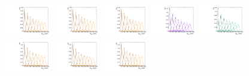 \begin{figure}[htbp]
  \centering
  \includegraphics[width=0.18\textwidth]{fig/2Dfit/templateSignalVsMX_fromDC_GbuToWW_MVV_mu_HP_bb_LDy.pdf}
  \includegraphics[width=0.18\textwidth]{fig/2Dfit/templateSignalVsMX_fromDC_RadToWW_MVV_mu_HP_bb_LDy.pdf}
  \includegraphics[width=0.18\textwidth]{fig/2Dfit/templateSignalVsMX_fromDC_ZprToWW_MVV_mu_HP_bb_LDy.pdf}
  \includegraphics[width=0.18\textwidth]{fig/2Dfit/templateSignalVsMX_fromDC_WprToWZ_MVV_mu_HP_bb_LDy.pdf}
  \includegraphics[width=0.18\textwidth]{fig/2Dfit/templateSignalVsMX_fromDC_WprToWH_MVV_mu_HP_bb_LDy.pdf}\\
  \includegraphics[width=0.18\textwidth]{fig/2Dfit/templateSignalVsMX_fromDC_GbuToWW_MVV_mu_LP_bb_LDy.pdf}
  \includegraphics[width=0.18\textwidth]{fig/2Dfit/templateSignalVsMX_fromDC_RadToWW_MVV_mu_LP_bb_LDy.pdf}
  \includegraphics[width=0.18\textwidth]{fig/2Dfit/templateSignalVsMX_fromDC_ZprToWW_MVV_mu_LP_bb_LDy.pdf}

\end{figure}
